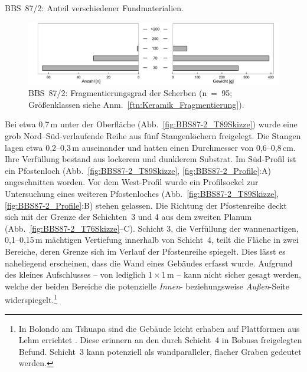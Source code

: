 \begin{table}[tb]
	\centering
	{\footnotesize }
	\caption{BBS~87/2: Anteil verschiedener Fundmaterialien.}
	\label{tab:BBS87-2_Funde}
\end{table}

\begin{figure}[tb]
	\centering
	\includegraphics[width=\textwidth]{fig/9-7_BBS87-2_Fragmentierung_2.pdf}
	\caption{BBS~87/2: Fragmentierungsgrad der Scherben  (n~=~95; Größenklassen siehe Anm.~\ref{ftn:Keramik_Fragmentierung}).}
	\label{fig:Fragmenierung_BBS87-2}
\end{figure}

Bei etwa 0,7\,m unter der Oberfläche (Abb.~\ref{fig:BBS87-2_T89Skizze}) wurde eine grob Nord--Süd-verlaufende Reihe aus fünf Stangenlöchern freigelegt. Die Stangen lagen etwa 0,2--0,3\,m auseinander und hatten einen Durchmesser von 0,6--0,8\,cm. Ihre Verfüllung bestand aus lockerem und dunklerem Substrat. Im Süd-Profil ist ein Pfostenloch (Abb.~\ref{fig:BBS87-2_T89Skizze}, \ref{fig:BBS87-2_Profile}:A) angeschnitten worden. Vor dem West-Profil wurde ein Profilsockel zur Untersuchung eines weiteren Pfostenloches (Abb.~\ref{fig:BBS87-2_T89Skizze}, \ref{fig:BBS87-2_Profile}:B) stehen gelassen. Die Richtung der Pfostenreihe deckt sich mit der Grenze der Schichten~3 und 4 aus dem zweiten Planum (Abb.~\ref{fig:BBS87-2_T76Skizze}--C). Schicht 3, die Verfüllung der wannenartigen, 0,1--0,15\,m mächtigen Vertiefung innerhalb von Schicht~4, teilt die Fläche in zwei Bereiche, deren Grenze sich im Verlauf der Pfostenreihe spiegelt. Dies lässt es naheliegend erscheinen, dass die Wand eines Gebäudes erfasst wurde. Aufgrund des kleines Aufschlusses -- von lediglich 1\,$\times$\,1\,m -- kann nicht sicher gesagt werden, welche der beiden Bereiche die potenzielle \textit{Innen}- beziehungsweise \textit{Außen}-Seite widerspiegelt.\footnote{In Bolondo am Tshuapa sind die Gebäude leicht erhaben auf Plattformen aus Lehm errichtet \parencite[369--376]{Wotzka.1995} . Diese erinnern an den durch Schicht~4 in Bobusa freigelegten Befund. Schicht~3 kann potenziell als wandparalleler, flacher Graben gedeutet werden.}


